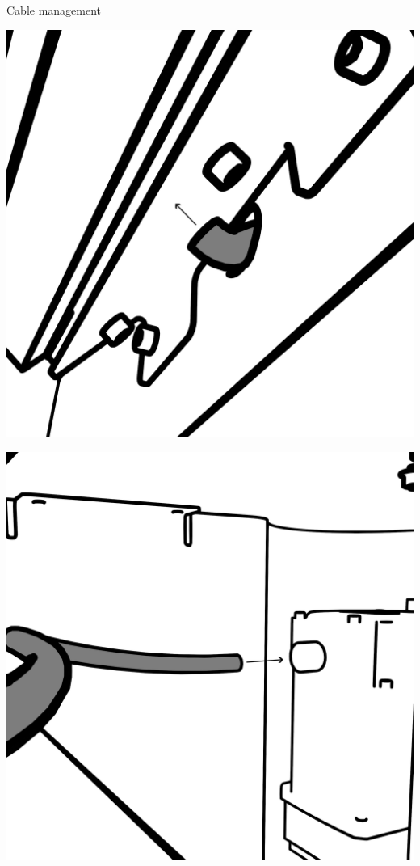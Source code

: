 \documentclass[a5paper,portrait]{article}
\begin{document}
\vspace*{2cm}
        {\color{mainblue}\sffamily\Huge Cable management}\\[1cm]
\begin{center}
  \begin{minipage}{0.48\textwidth}
    \centering
    \includegraphics[width=\textwidth]{../images/cable1.png}
  \end{minipage}
  \hfill
  \begin{minipage}{0.48\textwidth}
    \centering
    \includegraphics[width=\textwidth]{../images/Cable 2.png}
  \end{minipage}
\end{center}
\end{document}
